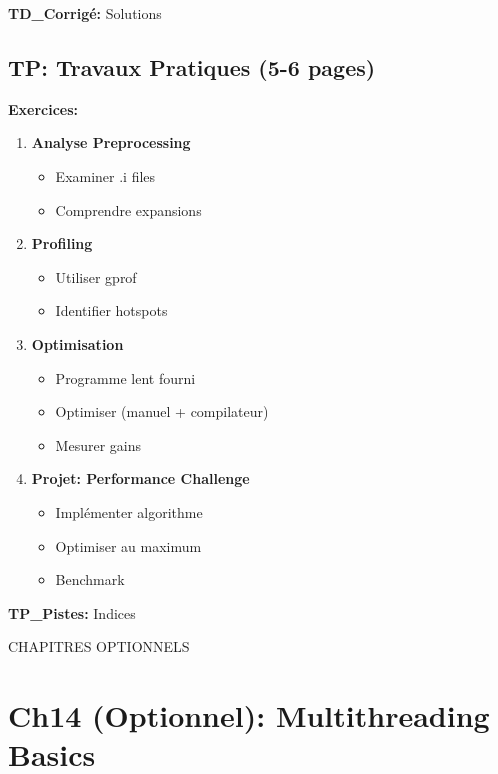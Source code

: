 \documentclass[10pt,a4paper]{article}
\begin{document}
\textbf{TD\_Corrigé:} Solutions

\subsection*{TP: Travaux Pratiques (5-6 pages)}

\textbf{Exercices:}
\begin{enumerate}
\item \textbf{Analyse Preprocessing}
   \begin{itemize}
   \item Examiner .i files
   \item Comprendre expansions
   \end{itemize}

\item \textbf{Profiling}
   \begin{itemize}
   \item Utiliser gprof
   \item Identifier hotspots
   \end{itemize}

\item \textbf{Optimisation}
   \begin{itemize}
   \item Programme lent fourni
   \item Optimiser (manuel + compilateur)
   \item Mesurer gains
   \end{itemize}

\item \textbf{Projet: Performance Challenge}
   \begin{itemize}
   \item Implémenter algorithme
   \item Optimiser au maximum
   \item Benchmark
   \end{itemize}
\end{enumerate}

\textbf{TP\_Pistes:} Indices

\newpage

\begin{partbox}
CHAPITRES OPTIONNELS
\end{partbox}

\section{Ch14 (Optionnel): Multithreading Basics}
\end{document}
